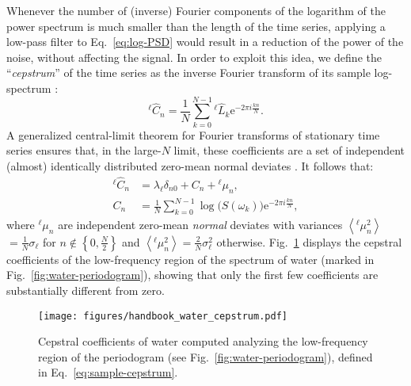 Whenever the number of (inverse) Fourier components of the logarithm of the power spectrum is much smaller than the length of the time series, applying a low-pass filter to Eq.~\eqref{eq:log-PSD} would result in a reduction of the power of the noise, without affecting the signal. In order to exploit this idea, we define the ``\emph{cepstrum}'' of the time series as the inverse Fourier transform of its sample log-spectrum \citep{Childers1977}:
\begin{equation}
  ^{\ell\!} \hat C_{n} = \frac{1}{N}\sum_{k=0}^{N-1} {^{\ell\!} \hat L_{k}} \mathrm{e}^{-2\pi i\frac{kn}{N}}. \label{eq:sample-cepstrum}
\end{equation}
A generalized central-limit theorem for Fourier transforms of stationary time series ensures that, in the large-$N$ limit, these coefficients are a set of independent (almost) identically distributed zero-mean normal deviates \citep{Anderson1994,Peligrad2010}. It follows that:
\begin{equation}
  \begin{aligned}
    ^{\ell\!} \hat  C_{n} &= \lambda_{\ell} \delta_{n0} + C_{n} +  {^{{\ell\!}}{\mu}}_{n}, \\
    C_{n} &= \frac{1}{N}\sum_{k=0}^{N-1} \log\bigl (S(\omega_k) \bigr ) \mathrm{e}^{-2\pi i\frac{kn}{N}},
  \end{aligned} \label{eq:cepstrogram}
\end{equation}
where $^{{\ell\!}}{\mu}_{n}$ are independent zero-mean \emph{normal} deviates with variances $\left\langle {^{{\ell\!}}{\mu}_{n}^2}  \right\rangle$ $=\frac{1}{N}\sigma_\ell$ for $n\notin\left\{ 0,\frac{N}{2}\right\}$ and $\left\langle ^{{\ell\!}}{\mu}_{n}^{2}\right\rangle =\frac{2}{N}\sigma_{\ell}^{2}$
otherwise.
Fig.~\ref{fig:water-cepstrum} displays the cepstral coefficients of the low-frequency region of the spectrum of water (marked in Fig.~\ref{fig:water-periodogram}), showing that only the first few coefficients are substantially different from zero.

\begin{figure}
\centering
\texttt{[image: figures/handbook\_water\_cepstrum.pdf]}
\caption{Cepstral coefficients of water computed analyzing the low-frequency region of the periodogram (see Fig.~\ref{fig:water-periodogram}), defined in Eq.~\eqref{eq:sample-cepstrum}. }  \label{fig:water-cepstrum}
\end{figure}

